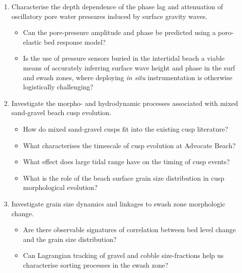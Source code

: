 \begin{enumerate}

  \item Characterise the depth dependence of the phase lag and attenuation of oscillatory pore water pressures induced by surface gravity waves.
  \begin{itemize}
    \item Can the pore-pressure amplitude and phase be predicted using a poro-elastic bed response model?
    \item Is the use of pressure sensors buried in the intertidal beach a viable means of accurately inferring surface wave height and phase in the surf and swash zones, where deploying \textit{in situ} instrumentation is otherwise logistically challenging?
  \end{itemize}

  \item Investigate the morpho- and hydrodynamic processes associated with mixed sand-gravel beach cusp evolution.
  \begin{itemize}
    \item How do mixed sand-gravel cusps fit into the existing cusp literature?
    \item What characterises the timescale of cusp evolution at Advocate Beach?
    \item What effect does large tidal range have on the timing of cusp events?
    \item What is the role of the beach surface grain size distribution in cusp morphological evolution?
  \end{itemize}
  
  \item Investigate grain size dynamics and linkages to swash zone morphologic change.
  \begin{itemize}
  	\item Are there observable signatures of correlation between bed level change and the grain size distribution?
    \item Can Lagrangian tracking of gravel and cobble size-fractions help us characterise sorting processes in the swash zone?
  \end{itemize}
  
\end{enumerate}

